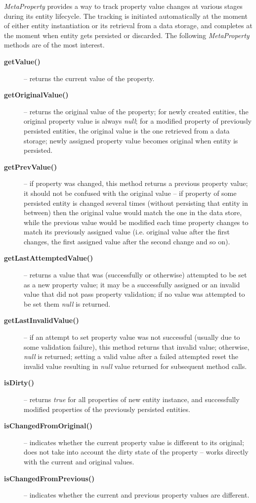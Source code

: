   \emph{MetaProperty} provides a way to track property value changes at various stages during its entity lifecycle.
  The tracking is initiated automatically at the moment of either entity instantiation or its retrieval from a data storage, and completes at the moment when entity gets persisted or discarded.
  The following \emph{MetaProperty} methods are of the most interest.
  \begin{description}
    \item[\textbf{getValue()}] -- returns the current value of the property.
    \item[\textbf{getOriginalValue()}] -- returns the original value of the property; for newly created entities, the original property value is always \emph{null}; for a modified property of previously persisted entities, the original value is the one retrieved from a data storage; newly assigned property value becomes original when entity is persisted.
    \item[\textbf{getPrevValue()}] -- if property was changed, this method returns a previous property value; it should not be confused with the original value -- if property of some persisted entity is changed several times (without persisting that entity in between) then the original value would match the one in the data store, while the previous value would be modified each time property changes to match its previously assigned value (i.e. original value after the first changes, the first assigned value after the second change and so on).
    \item[\textbf{getLastAttemptedValue()}] -- returns a value that was (successfully or otherwise) attempted to be set as a new property value; it may be a successfully assigned or an invalid value that did not pass property validation; if no value was attempted to be set them \emph{null} is returned.
    \item[\textbf{getLastInvalidValue()}] -- if an attempt to set property value was not successful (usually due to some validation failure), this method returns that invalid value; otherwise, \emph{null} is returned; setting a valid value after a failed attempted reset the invalid value resulting in \emph{null} value returned for subsequent method calls.
    \item[\textbf{isDirty()}] -- returns \emph{true} for all properties of new entity instance, and successfully modified properties of the previously persisted entities.
    \item[\textbf{isChangedFromOriginal()}] -- indicates whether the current property value is different to its original; does not take into account the dirty state of the property -- works directly with the current and original values.
    \item[\textbf{isChangedFromPrevious()}] -- indicates whether the current and previous property values are different.
  \end{description}  
  

